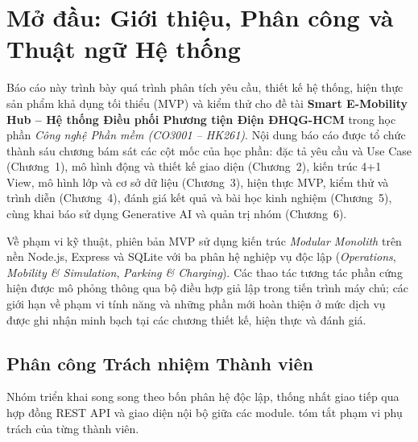 \section*{Mở đầu: Giới thiệu, Phân công và Thuật ngữ Hệ thống}

Báo cáo này trình bày quá trình phân tích yêu cầu, thiết kế hệ thống, hiện thực sản phẩm khả dụng tối thiểu (MVP) và kiểm thử cho đề tài \textbf{Smart E-Mobility Hub -- Hệ thống Điều phối Phương tiện Điện ĐHQG-HCM} trong học phần \textit{Công nghệ Phần mềm (CO3001 -- HK261)}. Nội dung báo cáo được tổ chức thành sáu chương bám sát các cột mốc của học phần: đặc tả yêu cầu và Use Case (Chương~1), mô hình động và thiết kế giao diện (Chương~2), kiến trúc 4+1 View, mô hình lớp và cơ sở dữ liệu (Chương~3), hiện thực MVP, kiểm thử và trình diễn (Chương~4), đánh giá kết quả và bài học kinh nghiệm (Chương~5), cùng khai báo sử dụng Generative AI và quản trị nhóm (Chương~6).

Về phạm vi kỹ thuật, phiên bản MVP sử dụng kiến trúc \textit{Modular Monolith} trên nền Node.js, Express và SQLite với ba phân hệ nghiệp vụ độc lập (\textit{Operations}, \textit{Mobility \& Simulation}, \textit{Parking \& Charging}). Các thao tác tương tác phần cứng hiện được mô phỏng thông qua bộ điều hợp giả lập trong tiến trình máy chủ; các giới hạn về phạm vi tính năng và những phần mới hoàn thiện ở mức dịch vụ được ghi nhận minh bạch tại các chương thiết kế, hiện thực và đánh giá.

\subsection*{Phân công Trách nhiệm Thành viên}

Nhóm triển khai song song theo bốn phân hệ độc lập, thống nhất giao tiếp qua hợp đồng REST API và giao diện nội bộ giữa các module.  tóm tắt phạm vi phụ trách của từng thành viên.

